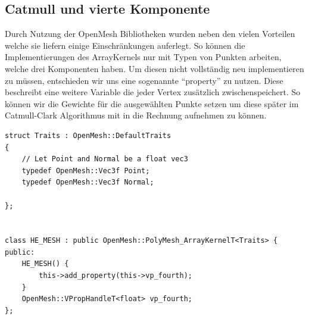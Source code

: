 \subsection{Catmull und vierte Komponente}

Durch Nutzung der OpenMesh Bibliotheken wurden neben den vielen Vorteilen welche sie liefern einige Einschränkungen auferlegt. So können die Implementierungen des ArrayKernels nur mit Typen von Punkten arbeiten, welche drei Komponenten haben. Um diesen nicht vollständig neu implementieren zu müssen, entschieden wir uns eine sogenannte ``property'' zu nutzen. Diese beschreibt eine weitere Variable die jeder Vertex zusätzlich zwischenspeichert. So können wir die Gewichte für die ausgewählten Punkte setzen um diese später im Catmull-Clark Algorithmus mit in die Rechnung aufnehmen zu können.

\begin{lstlisting}
struct Traits : OpenMesh::DefaultTraits
{
    // Let Point and Normal be a float vec3
    typedef OpenMesh::Vec3f Point;
    typedef OpenMesh::Vec3f Normal;

};


class HE_MESH : public OpenMesh::PolyMesh_ArrayKernelT<Traits> {
public:
    HE_MESH() {
        this->add_property(this->vp_fourth);
    }
    OpenMesh::VPropHandleT<float> vp_fourth;
};
\end{lstlisting}

